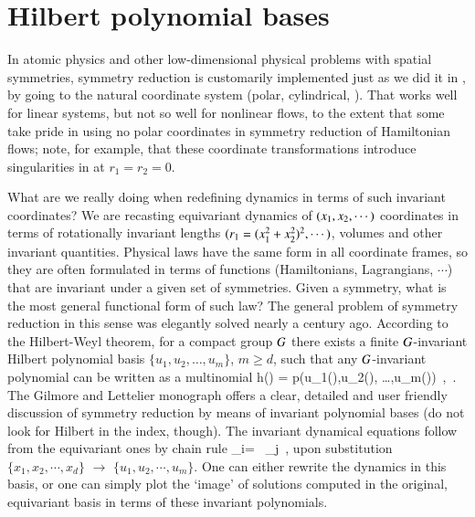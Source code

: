 \documentclass[preprint,number,sort&compress]{elsarticle}
\begin{document}
\section{\label{s:Hilbert} Hilbert polynomial bases}

In atomic physics and other low-dimensional physical problems
with spatial symmetries, symmetry reduction is customarily
implemented just as we did it in , by
going to the natural coordinate system (polar, cylindrical,
\etc). That works well for linear systems, but not so well
for nonlinear flows, to the extent that some take pride in
using no polar coordinates in symmetry reduction of
Hamiltonian flows; note, for
example, that these coordinate transformations introduce
singularities in  at $r_1=r_2=0$.

What are we really doing when redefining dynamics in terms of
such in\-vari\-ant coordinates? We are recasting
equi\-vari\-ant dynamics of $(x_1,x_2,\cdots)$
coordinates in terms of rotationally in\-vari\-ant lengths
$(r_1=(x_1^2+x_2^2)^2,\cdots)$, volumes and other
in\-vari\-ant quantities. Physical laws have the same form in
all coordinate frames, so they are often formulated in terms
of functions (Hamiltonians, Lagrangians, $\cdots$) {that are}
in\-vari\-ant under a given set of symmetries. Given a
symmetry, what is the most general functional form of such
law? The general problem of symmetry reduction in this sense
{was} elegantly solved nearly a century ago. According to the
Hilbert-Weyl theorem, for a compact group $G$ there
exists a finite $G${-in\-vari\-ant} Hilbert polynomial
basis $\{u_1,u_2, \dots,u_m\}$, $ m \geq d$, such that any
$G${-in\-vari\-ant} polynomial can be written as a
multinomial
\beq
h(\ssp) = p(u_1(\ssp),u_2(\ssp), \dots,u_m(\ssp))
    \,,\qquad \ssp \in \pS
\,.
The Gilmore and Lettelier monograph offers a
clear, detailed and user friendly discussion of symmetry
reduction by means of in\-vari\-ant polynomial bases (do not
look for Hilbert in the index, though). The in\-vari\-ant
dynamical equations follow from the equi\-vari\-ant ones by
chain rule
\beq
 _i= \, _j
 \,,
upon substitution $\{x_1,x_2,\cdots,x_d\}$ $\to$
$\{u_1,u_2,\cdots,u_m\}$. One can either rewrite the dynamics
in this basis, or one can simply plot the `image' of
solutions computed in the original, equi\-vari\-ant basis in
terms of these in\-vari\-ant polynomials.
\end{document}
